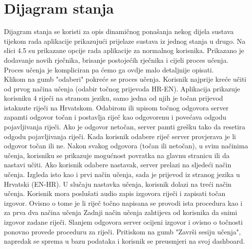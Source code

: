 		\section{Dijagram stanja}
        Dijagram stanja se koristi za opis dinamičnog ponašanja nekog dijela sustava tijekom rada aplikacije prikazujući prijelaze sustava iz jednog stanja u drugo.
        Na slici 4.5 su prikazane opcije rada aplikacije za normalnog korisnika. Prikazano je dodavanje novih rječnika, brisanje postojećih rječnika i cijeli proces učenja.
        Proces učenja je kompliciran pa ćemo ga ovdje malo detaljnije opisati.
        \indent \\
        Klikom na gumb "odaberi" pokreće se proces učenja. Korisnik najprije kreće učiti od prvog načina učenja (odabir točnog prijevoda HR-EN). 
        Aplikacija prikazuje korisniku 4 riječi na stranom jeziku, samo jedna od njih je točan prijevod istaknute riječi na Hrvatskom.
        Odabirom ili upisom točnog odgovora server zapamti odgovor točan i postavlja riječ kao odgovorenu i povećava odgodu pojavljivanja riječi. Ako je odgovor netočan, server pamti grešku tako da resetira odgodu pojavljivanja riječi. 
        Kada korisnik odabere riječ server provjerava je li odgovor točan ili ne. Nakon svakog odgovora (točan ili netočan), u svim načinima učenja, korisniku se prikazuje mogućnost povratka na glavnu stranicu ili da nastavi učiti.
        Ako korisnik odabere nastavak, server prelazi na sljedeći način učenja. Izgleda isto kao i prvi način učenja, sada je prijevod iz stranog jezika u Hrvatski (EN-HR).
        U slučaju nastavka učenja, korisnik dolazi na treći način učenja. Korisnik mora poslušati audio zapis izgovora riječi i zapisati točan izgovor. Ovisno o tome je li riječ točno napisana se provodi ista procedura kao i za prva dva načina učenja
        Zadnji način učenja zahtijeva od korisnika da snimi izgovor zadane riječi. Slanjem odgovora server ocijeni izgovor i ovisno o točnosti ponovno provede proceduru za riječi.
        Pritiskom na gumb "Završi sesiju učenja", napredak se sprema u bazu podataka i korisnik se preusmjeri na svoj dashboard.
        
